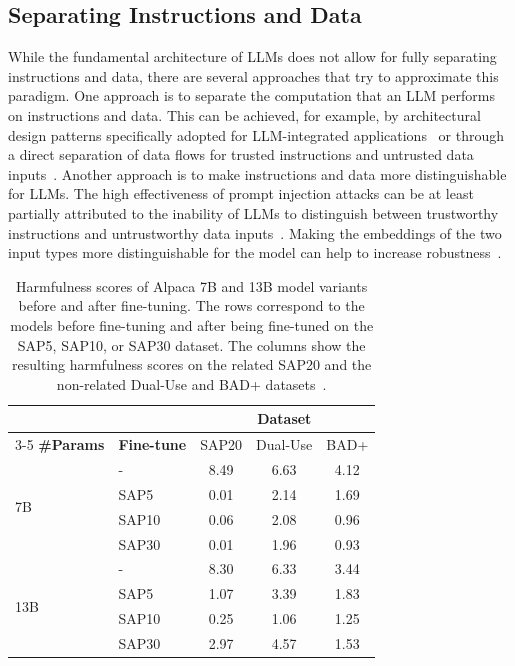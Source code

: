 \subsection{Separating Instructions and Data}
While the fundamental architecture of LLMs does not allow for fully separating instructions and data, there are several approaches that try to approximate this paradigm.
One approach is to separate the computation that an LLM performs on instructions and data.
This can be achieved, for example, by architectural design patterns specifically adopted for LLM-integrated applications~\cite{beurer-kellner_design_2025} or through a direct separation of data flows for trusted instructions and untrusted data inputs~\cite{debenedetti_defeating_2025}.
Another approach is to make instructions and data more distinguishable for LLMs.
The high effectiveness of prompt injection attacks can be at least partially attributed to the inability of LLMs to distinguish between trustworthy instructions and untrustworthy data inputs~\cite{zverev_can_2024}.
Making the embeddings of the two input types more distinguishable for the model can help to increase robustness~\cite{zverev_aside_2025}.\\

\begin{table}[htb]
    \centering
    \caption{Harmfulness scores of Alpaca 7B and 13B model variants before and after fine-tuning. The rows correspond to the models before fine-tuning and after being fine-tuned on the SAP5, SAP10, or SAP30 dataset. The columns show the resulting harmfulness scores on the related SAP20 and the non-related Dual-Use and BAD+ datasets~\cite{deng_attack_2023}.}
    \label{tab:fine_tune_defense}
    \begin{tabular}{@{}llccc@{}}
        \toprule
         & & \multicolumn{3}{c}{\textbf{Dataset}} \\
        \cmidrule{3-5}
        \textbf{\#Params} & \textbf{Fine-tune} & SAP20 & Dual-Use & BAD+ \\
        \midrule
        \multirow{4}{*}{7B}     & -     & 8.49  & 6.63  & 4.12 \\
                                & SAP5  & 0.01  & 2.14  & 1.69 \\
                                & SAP10 & 0.06  & 2.08  & 0.96 \\
                                & SAP30 & 0.01  & 1.96  & 0.93 \\
        \midrule
        \multirow{4}{*}{13B}    & -     & 8.30  & 6.33  & 3.44 \\
                                & SAP5  & 1.07  & 3.39  & 1.83 \\
                                & SAP10 & 0.25  & 1.06  & 1.25 \\
                                & SAP30 & 2.97  & 4.57  & 1.53 \\
        \bottomrule
    \end{tabular}
\end{table}

